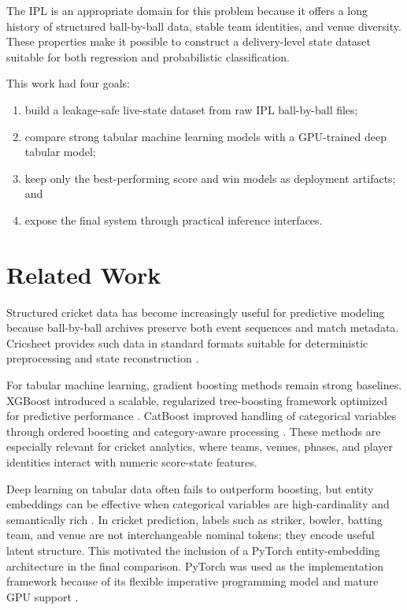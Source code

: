 \documentclass[conference]{IEEEtran}
\begin{document}
The IPL is an appropriate domain for this problem because it offers a long history of structured ball-by-ball data, stable team identities, and venue diversity. These properties make it possible to construct a delivery-level state dataset suitable for both regression and probabilistic classification.

This work had four goals:
\begin{enumerate}
\item build a leakage-safe live-state dataset from raw IPL ball-by-ball files;
\item compare strong tabular machine learning models with a GPU-trained deep tabular model;
\item keep only the best-performing score and win models as deployment artifacts; and
\item expose the final system through practical inference interfaces.
\end{enumerate}

\section{Related Work}
Structured cricket data has become increasingly useful for predictive modeling because ball-by-ball archives preserve both event sequences and match metadata. Cricsheet provides such data in standard formats suitable for deterministic preprocessing and state reconstruction \cite{cricsheet-format,cricsheet-matches}.

For tabular machine learning, gradient boosting methods remain strong baselines. XGBoost introduced a scalable, regularized tree-boosting framework optimized for predictive performance \cite{xgboost}. CatBoost improved handling of categorical variables through ordered boosting and category-aware processing \cite{catboost}. These methods are especially relevant for cricket analytics, where teams, venues, phases, and player identities interact with numeric score-state features.

Deep learning on tabular data often fails to outperform boosting, but entity embeddings can be effective when categorical variables are high-cardinality and semantically rich \cite{entity-embeddings}. In cricket prediction, labels such as striker, bowler, batting team, and venue are not interchangeable nominal tokens; they encode useful latent structure. This motivated the inclusion of a PyTorch entity-embedding architecture in the final comparison. PyTorch was used as the implementation framework because of its flexible imperative programming model and mature GPU support \cite{pytorch}.
\end{document}
